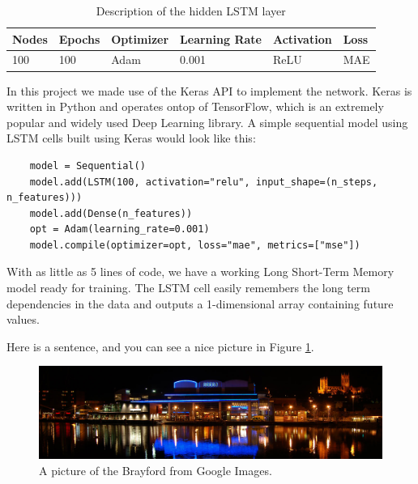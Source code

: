 \begin{table}[h]
    \centering
    \begin{tabular}{|l|l|l|l|l|l|}
        \hline
        \textbf{Nodes} & \textbf{Epochs} & \textbf{Optimizer} & \textbf{Learning Rate} & \textbf{Activation} & \textbf{Loss} \\ \hline
        100            & 100             & Adam               & 0.001                  & ReLU                & MAE           \\ \hline
        \end{tabular}
    \caption{Description of the hidden LSTM layer}
    \label{tab:lstm_layer}
\end{table}

In this project we made use of the Keras API to implement the network. Keras is written in Python and operates ontop of TensorFlow, which is an extremely popular and widely used Deep Learning library. A simple sequential model using LSTM cells built using Keras would look like this:

\begin{verbatim}
    model = Sequential()
    model.add(LSTM(100, activation="relu", input_shape=(n_steps, n_features)))
    model.add(Dense(n_features))
    opt = Adam(learning_rate=0.001)
    model.compile(optimizer=opt, loss="mae", metrics=["mse"])
\end{verbatim}

With as little as 5 lines of code, we have a working Long Short-Term Memory model ready for training. The LSTM cell easily remembers the long term dependencies in the data and outputs a 1-dimensional array containing future values.


Here is a sentence, and you can see a nice picture in Figure \ref{fig:brayford}.

\begin{figure}[ht]
    \centering
    \includegraphics[width=\textwidth]{figures/brayford.jpg}
    \caption{A picture of the Brayford from Google Images.}
    \label{fig:brayford}
\end{figure}

